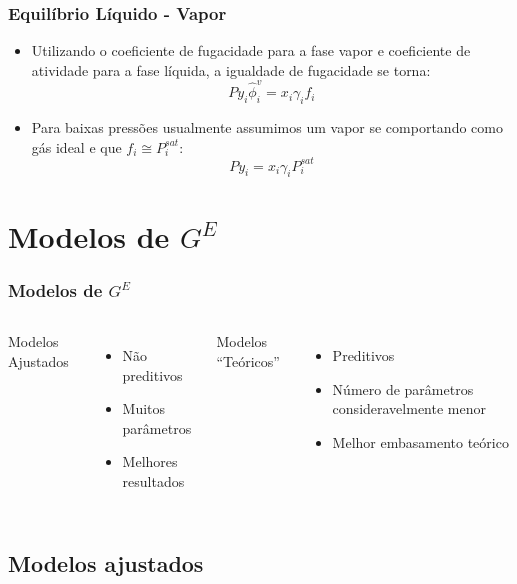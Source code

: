 \documentclass[aspectratio=169]{beamer}
\begin{document}
\begin{frame}
	\frametitle{Equilíbrio Líquido - Vapor}
	\begin{itemize}
		\item Utilizando o coeficiente de fugacidade para a fase vapor e
		coeficiente de atividade para a fase líquida, a igualdade de
		fugacidade se torna:
		\begin{equation*}
		P y_i \hat{\phi}_i^v = x_i \gamma_i f_i
		\end{equation*}
		\item Para baixas pressões usualmente assumimos um vapor se
		comportando como gás ideal e que $f_i \cong P_i^{sat}$:
		\begin{equation*}
		P y_i = x_i \gamma_i P_i^{sat}
		\end{equation*}
	\end{itemize}
\end{frame}

\section{Modelos de $G^E$}

\begin{frame}
	\frametitle{Modelos de $G^E$}
	\begin{columns}
		Modelos Ajustados
		\begin{itemize}
			\item Não preditivos
			\item Muitos parâmetros
			\item Melhores resultados
		\end{itemize}

		Modelos ``Teóricos''
		\begin{itemize}
			\item Preditivos
			\item Número de parâmetros consideravelmente menor
			\item Melhor embasamento teórico
		\end{itemize}
	\end{columns}
\end{frame}



\subsection*{Modelos ajustados}
\end{document}
